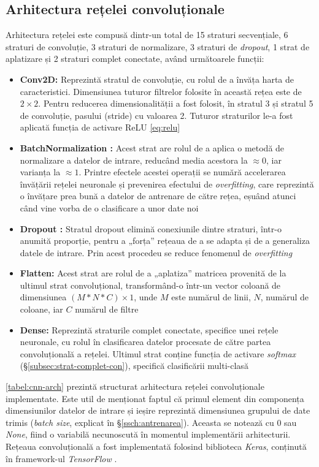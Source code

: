 \subsection{Arhitectura rețelei convoluționale}
Arhitectura rețelei este compusă dintr-un total de 15 straturi secvențiale, 6 straturi de convoluție, 3 straturi de normalizare, 3 straturi de \textit{dropout}, 1 strat de aplatizare și 2 straturi complet conectate, având următoarele funcții:
\begin{itemize}
\item \textbf{Conv2D:} Reprezintă stratul de convoluție, cu rolul de a învăța harta de caracteristici. Dimensiunea tuturor filtrelor folosite în această rețea este de $2\times2$. Pentru reducerea dimensionalității a fost folosit, în stratul 3 și stratul 5 de convoluție, pasului (stride) cu valoarea 2. Tuturor straturilor le-a fost aplicată funcția de activare ReLU \eqref{eq:relu}
\item \textbf{BatchNormalization \textnormal{\cite{ioffe2015batch}}:} Acest strat are rolul de a aplica o metodă de normalizare a datelor de intrare, reducând media acestora la $\approx0$, iar varianța la $\approx1$. Printre efectele acestei operații se numără accelerarea învățării rețelei neuronale și prevenirea efectului de \textit{overfitting}, care reprezintă o învățare prea bună a datelor de antrenare de către rețea, eșuând atunci când vine vorba de o clasificare a unor date noi
\item \textbf{Dropout \textnormal{\cite{hinton2012improving-dropout}}:} Stratul dropout elimină conexiunile dintre straturi, într-o anumită proporție, pentru a „forța” rețeaua de a se adapta și de a generaliza datele de intrare. Prin acest procedeu se reduce fenomenul de \textit{overfitting}
\item \textbf{Flatten:} Acest strat are rolul de a „aplatiza” matricea provenită de la ultimul strat convoluțional, transformând-o într-un vector coloană de dimensiunea $(M*N*C)\times1$, unde $M$ este numărul de linii, $N$, numărul de coloane, iar $C$ numărul de filtre
\item \textbf{Dense:} Reprezintă straturile complet conectate, specifice unei rețele neuronale, cu rolul în clasificarea datelor procesate de către partea convoluțională a rețelei. Ultimul strat conține funcția de activare \textit{softmax} (\S\ref{subsec:strat-complet-con}), specifică clasificării multi-clasă
\end{itemize}

\autoref{tabel:cnn-arch} prezintă structurat arhitectura rețelei convoluționale implementate. Este util de menționat faptul că primul element din componența dimensiunilor datelor de intrare și ieșire reprezintă dimensiunea grupului de date trimis (\textit{batch size}, explicat în \S\ref{ssch:antrenarea}). Aceasta se notează cu 0 sau \textit{None}, fiind o variabilă necunoscută în momentul implementării arhitecturii. Rețeaua convoluțională a fost implementată folosind biblioteca \textit{Keras}, conținută în framework-ul \textit{TensorFlow} \cite{online:tf-keras}.

